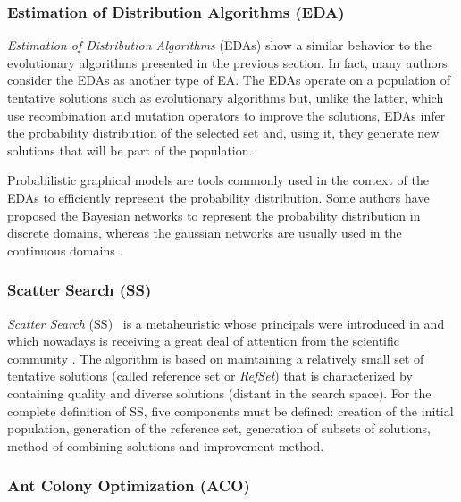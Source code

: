 \subsubsection{Estimation of Distribution Algorithms (EDA)}

\emph{Estimation of Distribution Algorithms} (EDAs) \cite{muhlenbein98equation} show a similar behavior to the evolutionary algorithms presented in the previous section. In fact, many authors consider the EDAs as another type of EA. The EDAs operate on a population of tentative solutions such as evolutionary algorithms but, unlike the latter, which use recombination and mutation operators to improve the solutions, EDAs infer the probability distribution of the selected set and, using it, they generate new solutions that will be part of the population.

Probabilistic graphical models are tools commonly used in the context of the EDAs to efficiently represent the probability distribution. Some authors \cite{larra99optimization, pelikan99boa, soto99introducing} have proposed the Bayesian networks to represent the probability distribution in discrete domains, whereas the gaussian networks are usually used in the continuous domains \cite{whittaker90graphical}.

\subsubsection{Scatter Search (SS)}

\emph{Scatter Search} (SS)~\cite{glover98template} is a metaheuristic whose principals were introduced in \cite{glover77heuristics} and which nowadays is receiving a great deal of attention from the scientific community \cite{laguna03scatter}. The algorithm is based on maintaining a relatively small set of tentative solutions (called reference set or \emph{RefSet}) that is characterized by containing quality and diverse solutions (distant in the search space). For the complete definition of SS, five components must be defined: creation of the initial population, generation of the reference set, generation of subsets of solutions, method of combining solutions and improvement method.

\subsubsection{Ant Colony Optimization (ACO)}

